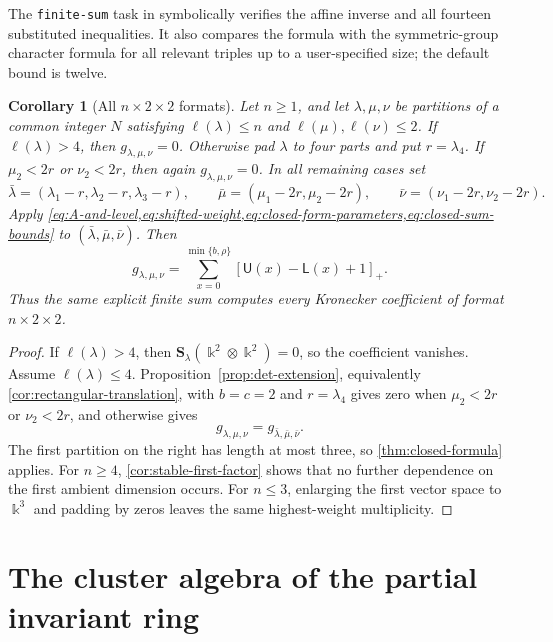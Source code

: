 \documentclass[11pt,reqno]{amsart}
\numberwithin{equation}{section}
\newtheorem{corollary}[corollary]{Corollary}
\theoremstyle{remark}
\newcommand{\kk}{\Bbbk}
\newcommand{\pos}[1]{\left[#1\right]_{+}}
\newcommand{\Schur}{\mathbf{S}}
\begin{document}
The \texttt{finite-sum} task in  symbolically verifies the affine inverse and all fourteen substituted inequalities.
It also compares the formula with the symmetric-group character formula for
all relevant triples up to a user-specified size; the default bound is twelve.

\begin{corollary}[All $n\times2\times2$ formats]
\label{cor:closed-formula-22n}
Let $n\ge1$, and let $\lambda,\mu,\nu$ be partitions of a common integer
$N$ satisfying
$\ell(\lambda)\le n$ and $\ell(\mu),\ell(\nu)\le2$.
If $\ell(\lambda)>4$, then $g_{\lambda,\mu,\nu}=0$.  Otherwise pad
$\lambda$ to four parts and put $r=\lambda_4$.  If
$\mu_2<2r$ or $\nu_2<2r$, then again
$g_{\lambda,\mu,\nu}=0$.  In all remaining cases set
\[ \bar\lambda=(\lambda_1-r,\lambda_2-r,\lambda_3-r), \qquad \bar\mu=(\mu_1-2r,\mu_2-2r), \qquad \bar\nu=(\nu_1-2r,\nu_2-2r). \]
Apply \cref{eq:A-and-level,eq:shifted-weight,eq:closed-form-parameters,eq:closed-sum-bounds}
to $(\bar\lambda,\bar\mu,\bar\nu)$.  Then
\[ g_{\lambda,\mu,\nu} =\sum_{x=0}^{\min\{b,\rho\}} \pos{\mathsf U(x)-\mathsf L(x)+1}. \]
Thus the same explicit finite sum computes every Kronecker coefficient of
format $n\times2\times2$.
\end{corollary}

\begin{proof}
If $\ell(\lambda)>4$, then
$\Schur_\lambda(\kk^2\otimes\kk^2)=0$, so the coefficient vanishes.
Assume $\ell(\lambda)\le4$.  Proposition~\ref{prop:det-extension}, equivalently
\cref{cor:rectangular-translation}, with $b=c=2$ and
$r=\lambda_4$ gives zero when $\mu_2<2r$ or $\nu_2<2r$, and
otherwise gives
\[ g_{\lambda,\mu,\nu}=g_{\bar\lambda,\bar\mu,\bar\nu}. \]
The first partition on the right has length at most three, so
\cref{thm:closed-formula} applies.  For $n\ge4$,
\cref{cor:stable-first-factor} shows that no further dependence on the first
ambient dimension occurs.  For $n\le3$, enlarging the first vector space to
$\kk^3$ and padding by zeros leaves the same highest-weight multiplicity.
\end{proof}


\appendix
\raggedbottom

\section{The cluster algebra of the partial invariant ring}
\label{app:partial-ring}
\end{document}
